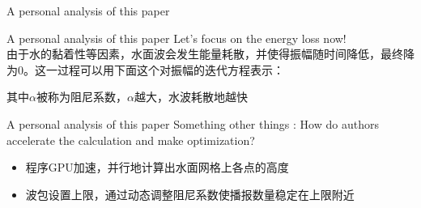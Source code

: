 \documentclass{beamer}
\begin{document}
\begin{frame}{A personal analysis of this paper}

\begin{figure}[thpb]
    \centering
  \label{fig:system}
  \end{figure}
\end{frame}
\begin{frame}{A personal analysis of this paper}
  Let's focus on the energy loss now!
  \\由于水的黏着性等因素，水面波会发生能量耗散，并使得振幅随时间降低，最终降为0。这一过程可以用下面这个对振幅的迭代方程表示：
  \begin{figure}[thpb]
    \centering
  \label{fig:system}
  \end{figure}
  其中$\alpha$被称为阻尼系数，$\alpha$越大，水波耗散地越快
\end{frame}
\begin{frame}{A personal analysis of this paper}
  Something other things : How do authors accelerate the calculation and make optimization?
  \begin{itemize}
    \item 程序GPU加速，并行地计算出水面网格上各点的高度
    \item 波包设置上限，通过动态调整\textcolor[rgb]{0,0,1}{阻尼系数}使播报数量稳定在上限附近
  \end{itemize}
\end{frame}
\end{document}
